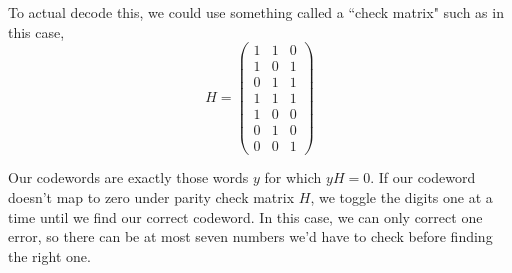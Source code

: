  \vspace{0.2cm}

To actual decode this, we could use something called a ``check matrix" such as in this case,
\[
H= \begin{pmatrix} 1 & 1 & 0 \\ 1 & 0 & 1 \\ 0 & 1 & 1 \\ 1 & 1 & 1 \\ 1 & 0 & 0 \\ 0 & 1 & 0 \\ 0 & 0 & 1 \end{pmatrix}
\]

Our codewords are exactly those words $y$ for which $yH=0$. If our codeword doesn't map to zero under parity check matrix $H$, we toggle the digits one at a time until we find our correct codeword. In this case, we can only correct one error, so there can be at most seven numbers we'd have to check before finding the right one. \\

